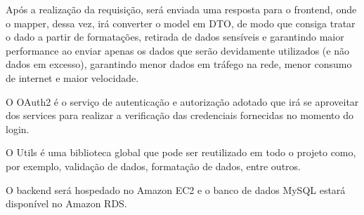 Após a realização da requisição, será enviada uma resposta para o frontend, onde o mapper, dessa vez, irá converter o model em DTO, de modo que consiga tratar o dado a partir de formatações, retirada de dados sensíveis e garantindo maior performance ao enviar apenas os dados que serão devidamente utilizados (e não dados em excesso), garantindo menor dados em tráfego na rede, menor consumo de internet e maior velocidade.

O OAuth2 é o serviço de autenticação e autorização adotado que irá se aproveitar dos services para realizar a verificação das credenciais fornecidas no momento do login.

O Utils é uma biblioteca global que pode ser reutilizado em todo o projeto como, por exemplo, validação de dados, formatação de dados, entre outros.

O backend será hospedado no Amazon EC2 e o banco de dados MySQL estará disponível no Amazon RDS.
